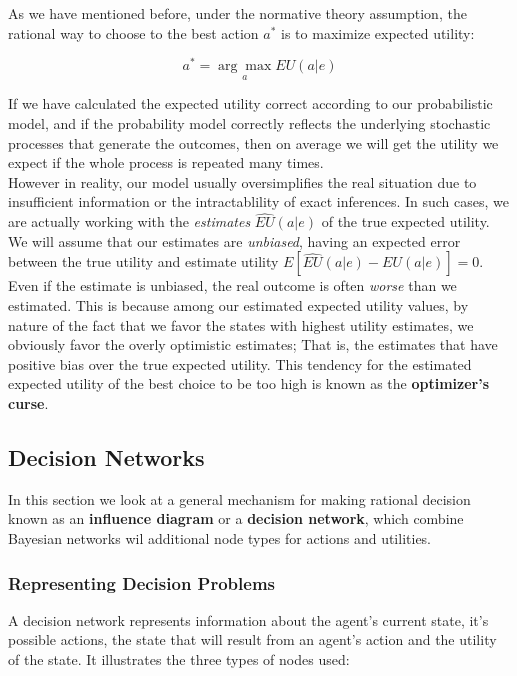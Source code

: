 \documentclass[11pt]{article}
\begin{document}
As we have mentioned before, under the normative theory assumption, the rational way to choose to the best action $a^*$ is to maximize expected utility:

$$
a^* = \underset{a}{\arg\max} EU(a | e)
$$

If we have calculated the expected utility correct according to our probabilistic model, and if the probability model correctly reflects the underlying stochastic processes that generate the outcomes, then on average we will get the utility we expect if the whole process is repeated many times.\\

However in reality, our model usually oversimplifies the real situation due to insufficient information or the intractablility
of exact inferences. In such cases, we are actually working with the \textit{estimates} $\hat{EU}(a|e)$ of the true expected utility. We will assume that our estimates are \textit{unbiased}, having an expected error between the true utility and estimate utility $E[\hat{EU}(a|e) - EU(a|e)] = 0$.\\

Even if the estimate is unbiased, the real outcome is often \textit{worse} than we estimated. This is because among our estimated expected utility values, by nature of the fact that we favor the states with highest utility estimates, we obviously favor the overly optimistic estimates; That is, the estimates that have positive bias over the true expected utility. This tendency for the estimated expected utility of the best choice to be too high is known as the \textbf{optimizer's curse}.

\subsection{Decision Networks}

In this section we look at a general mechanism for making rational decision known as an \textbf{influence diagram} or a \textbf{decision network}, which combine Bayesian networks wil additional node types for actions and utilities.

\subsubsection{Representing Decision Problems}

A decision network represents information about the agent's current state, it's possible actions, the state that will result from an agent's action and the utility of the state. It illustrates the three types of nodes used: 
\end{document}
